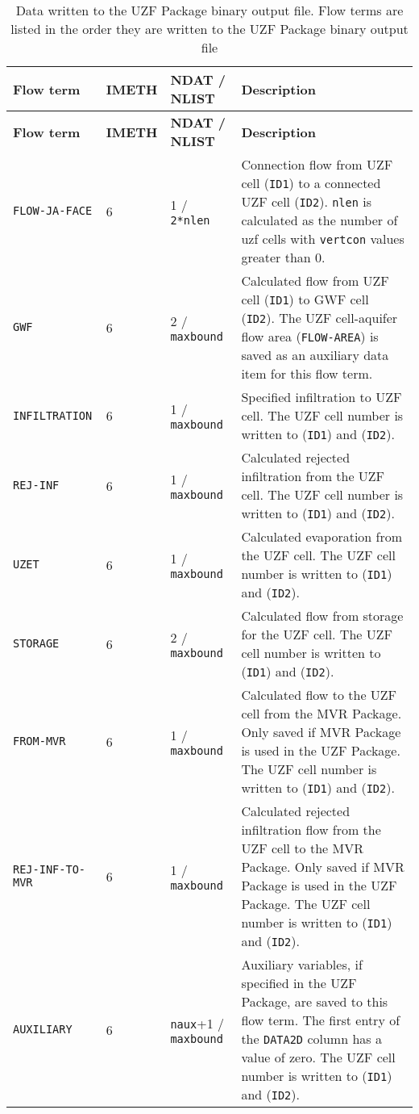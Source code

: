 \newpage
\begin{longtable}{p{3.5cm} p{2cm} p{3.5cm} p{6.5cm}}
\caption{Data written to the UZF Package binary output file. Flow terms are listed in the order they are written to the UZF Package binary output file} \tabularnewline
\hline
\hline
\textbf{Flow term} & \textbf{IMETH} & \textbf{NDAT / NLIST} & \textbf{Description} \\
\hline
\endfirsthead

\hline
\hline
\textbf{Flow term} & \textbf{IMETH} & \textbf{NDAT / NLIST} & \textbf{Description} \\
\hline
\endhead

\hline
\endfoot

\texttt{FLOW-JA-FACE} & 6 & 1 / \texttt{2*nlen} & Connection flow from UZF cell (\texttt{ID1}) to a connected UZF cell (\texttt{ID2}). \texttt{nlen} is calculated as the number of uzf cells with \texttt{vertcon} values greater than 0.\\
\texttt{GWF} & 6 & 2 / \texttt{maxbound} & Calculated flow from UZF cell (\texttt{ID1}) to GWF cell (\texttt{ID2}). The UZF cell-aquifer flow area (\texttt{FLOW-AREA}) is saved as an auxiliary data item for this flow term.\\
\texttt{INFILTRATION} & 6 & 1 / \texttt{maxbound} & Specified infiltration to UZF cell. The UZF cell number is written to (\texttt{ID1}) and (\texttt{ID2}). \\
\texttt{REJ-INF} & 6 & 1 / \texttt{maxbound} & Calculated rejected infiltration from the UZF cell. The UZF cell number is written to (\texttt{ID1}) and (\texttt{ID2}). \\
\texttt{UZET} & 6 & 1 / \texttt{maxbound} & Calculated evaporation from the UZF cell. The UZF cell number is written to (\texttt{ID1}) and (\texttt{ID2}). \\
\texttt{STORAGE} & 6 & 2 / \texttt{maxbound} & Calculated flow from storage for the UZF cell. The UZF cell number is written to (\texttt{ID1}) and (\texttt{ID2}). \\
\texttt{FROM-MVR} & 6 & 1 / \texttt{maxbound} & Calculated flow to the UZF cell from the MVR Package. Only saved if MVR Package is used in the UZF Package. The UZF cell number is written to (\texttt{ID1}) and (\texttt{ID2}). \\
\texttt{REJ-INF-TO-MVR} & 6 & 1 / \texttt{maxbound} & Calculated rejected infiltration flow from the UZF cell to the MVR Package. Only saved if MVR Package is used in the UZF Package. The UZF cell number is written to (\texttt{ID1}) and (\texttt{ID2}). \\
\texttt{AUXILIARY} & 6 & \texttt{naux}+1 / \texttt{maxbound} & Auxiliary variables, if specified in the UZF Package, are saved to this flow term. The first entry of the \texttt{DATA2D} column has a value of zero.  The UZF cell number is written to (\texttt{ID1}) and (\texttt{ID2}). 
\label{table:binaryuzf}
\end{longtable}


